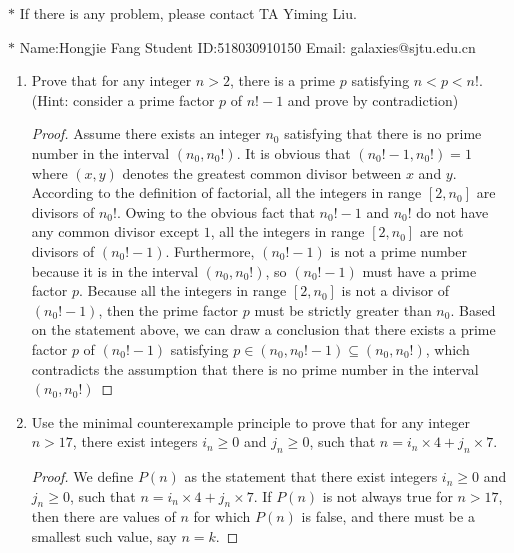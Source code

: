 \documentclass[12pt,a4paper]{article}
\theoremstyle{definition}
\begin{document}
\noindent

\noindent{}
\begin{center}
\footnotesize{\color{red}$*$ If there is any problem, please contact TA Yiming Liu.}

\footnotesize{\color{blue}$*$ Name:Hongjie Fang  \quad Student ID:518030910150 \quad Email: galaxies@sjtu.edu.cn}
\end{center}

\begin{enumerate}
    \item
    Prove that for any integer $n>2$, there is a prime $p$ satisfying $n<p<n!$. {\color{blue}(Hint: consider a prime factor $p$ of $n!-1$ and prove by contradiction)}
    \begin{proof}
        Assume there exists an integer $n_0$ satisfying that there is no prime number in the interval $(n_0, n_0!)$. It is obvious that $(n_0! - 1, n_0!) = 1$ where $(x, y)$ denotes the greatest common divisor between $x$ and $y$. According to the definition of factorial, all the integers in range $[2, n_0]$ are divisors of $n_0!$. Owing to the obvious fact that $n_0! - 1$ and $n_0!$ do not have any common divisor except $1$, all the integers in range $[2, n_0]$ are not divisors of $(n_0!-1)$. Furthermore, $(n_0!-1)$ is not a prime number because it is in the interval $(n_0, n_0!)$, so $(n_0!-1)$ must have a prime factor $p$. Because all the integers in range $[2, n_0]$ is not a divisor of $(n_0!-1)$, then the prime factor $p$ must be strictly greater than $n_0$. Based on the statement above, we can draw a conclusion that there exists a prime factor $p$ of $(n_0!-1)$ satisfying $p \in (n_0, n_0!-1) \subseteq (n_0, n_0!)$, which contradicts the assumption that there is no prime number in the interval $(n_0, n_0!)$
    \end{proof}

    \item
    Use the minimal counterexample principle to prove that for any integer $n>17$, there exist integers $i_n\ge 0$ and $j_n\ge 0$, such that $n = i_n \times 4 + j_n \times 7$.
    \begin{proof}
        We define $P(n)$ as the statement that there exist integers $i_n\ge 0$ and $j_n\ge 0$, such that $n = i_n \times 4 + j_n \times 7$. If $P(n)$ is not always true for $n > 17$, then there are values of $n$ for which $P(n)$ is false, and there must be a smallest such value, say $n = k$.


\end{proof}
\end{enumerate}
\end{document}
